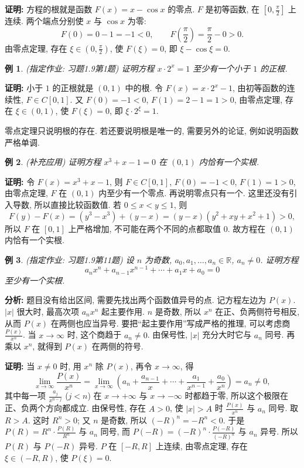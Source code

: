 \documentclass[UTF8,openany]{ctexbook}
\theoremstyle{chinesetextbook}
\newtheorem{example}{例}[section]
\newenvironment{cnproof}{\par\indent\textbf{证明:} \ignorespaces}{\par}
\begin{document}
\begin{cnproof}
方程的根就是函数 $F(x)=x-\cos x$ 的零点. $F$ 是初等函数, 在 $\displaystyle\left[0,\frac\pi2\right]$ 上连续. 两个端点分别使 $x$ 与 $\cos x$ 为零:
\[
F(0)=0-1=-1<0,\qquad F\!\left(\frac\pi2\right)=\frac\pi2-0>0.
\]
由零点定理, 存在 $\displaystyle\xi\in\left(0,\frac\pi2\right)$, 使 $F(\xi)=0$, 即 $\xi-\cos\xi=0$.
\end{cnproof}
\begin{example}
\textnormal{(指定作业: 习题1.9第1题)} 证明方程 $x\cdot2^x=1$ 至少有一个小于 $1$ 的正根.
\end{example}
\begin{cnproof}
小于 $1$ 的正根就是 $(0,1)$ 中的根. 令 $F(x)=x\cdot2^x-1$, 由初等函数的连续性, $F\in C[0,1]$. 又 $F(0)=-1<0$, $F(1)=2-1=1>0$, 由零点定理, 存在 $\xi\in(0,1)$, 使 $F(\xi)=0$, 即 $\xi\cdot2^\xi=1$.
\end{cnproof}
零点定理只说明根的存在. 若还要说明根是唯一的, 需要另外的论证, 例如说明函数严格单调.
\begin{example}
\textnormal{(补充应用)} 证明方程 $x^3+x-1=0$ 在 $(0,1)$ 内恰有一个实根.
\end{example}
\begin{cnproof}
令 $F(x)=x^3+x-1$, 则 $F\in C[0,1]$, $F(0)=-1<0$, $F(1)=1>0$, 由零点定理, $F$ 在 $(0,1)$ 内至少有一个零点. 再说明零点只有一个. 这里还没有引入导数, 所以直接比较函数值. 若 $0\le x<y\le1$, 则
\[
F(y)-F(x)=(y^3-x^3)+(y-x)=(y-x)(y^2+xy+x^2+1)>0,
\]
所以 $F$ 在 $[0,1]$ 上严格增加, 不可能在两个不同的点都取值 $0$. 故方程在 $(0,1)$ 内恰有一个实根.
\end{cnproof}
\begin{example}
\textnormal{(指定作业: 习题1.9第11题)} 设 $n$ 为奇数, $a_0,a_1,\ldots,a_n\in\mathbb R$, $a_n\ne0$. 证明方程
\[
a_nx^n+a_{n-1}x^{n-1}+\cdots+a_1x+a_0=0
\]
至少有一个实根.
\end{example}
\par\indent\textbf{分析:} 题目没有给出区间, 需要先找出两个函数值异号的点. 记方程左边为 $P(x)$. $|x|$ 很大时, 最高次项 $a_nx^n$ 起主要作用. $n$ 是奇数, 所以 $x^n$ 在正、负两侧符号相反, 从而 $P(x)$ 在两侧也应当异号. 要把“起主要作用”写成严格的推理, 可以考虑商 $\displaystyle\frac{P(x)}{x^n}$. 当 $x\to\infty$ 时, 这个商趋于 $a_n\ne0$. 由保号性, $|x|$ 充分大时它与 $a_n$ 同号. 再乘以 $x^n$, 就得到 $P(x)$ 在两侧的符号.
\begin{cnproof}
当 $x\ne0$ 时, 用 $x^n$ 除 $P(x)$, 再令 $x\to\infty$, 得
\[
\lim_{x\to\infty}\frac{P(x)}{x^n}=\lim_{x\to\infty}\left(a_n+\frac{a_{n-1}}x+\cdots+\frac{a_1}{x^{n-1}}+\frac{a_0}{x^n}\right)=a_n\ne0,
\]
其中每一项 $\displaystyle\frac{a_j}{x^{n-j}}$ ($j<n$) 在 $x\to+\infty$ 与 $x\to-\infty$ 时都趋于零, 所以这个极限在正、负两个方向都成立. 由保号性, 存在 $A>0$, 使 $|x|>A$ 时 $\displaystyle\frac{P(x)}{x^n}$ 与 $a_n$ 同号. 取 $R>A$. 这时 $R^n>0$; 又 $n$ 是奇数, 所以 $(-R)^n=-R^n<0$. 于是 $\displaystyle P(R)=R^n\cdot\frac{P(R)}{R^n}$ 与 $a_n$ 同号, 而 $\displaystyle P(-R)=(-R)^n\cdot\frac{P(-R)}{(-R)^n}$ 与 $a_n$ 异号. 所以 $P(R)$ 与 $P(-R)$ 异号. $P$ 在 $[-R,R]$ 上连续, 由零点定理, 存在 $\xi\in(-R,R)$, 使 $P(\xi)=0$.
\end{cnproof}
\end{document}
